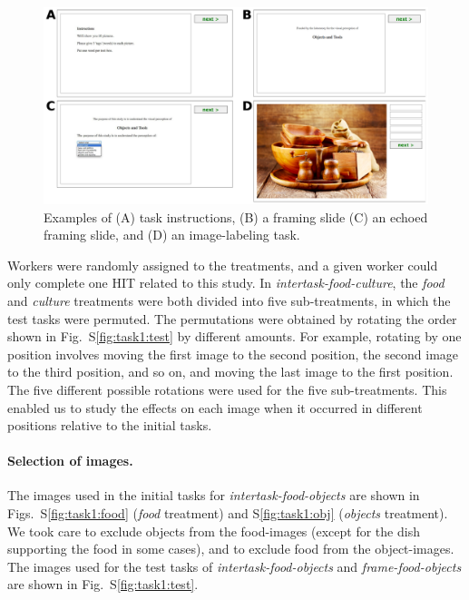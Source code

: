 \documentclass[12pt]{article}
\begin{document}
\begin{figure}
	\includegraphics[scale=0.8]{figs/tasks.pdf}
	\caption{Examples of (A) task instructions, (B) a framing slide
		(C) an echoed framing slide, and (D) an image-labeling 
		task.
	}
	\label{fig:hit_preamble}
\end{figure}
Workers were randomly assigned to the treatments, and 
a given worker could only complete one HIT related to this study.  
In \textit{intertask-food-culture}, the \textit{food} and \textit{culture}
treatments were both divided into five sub-treatments, 
in which the test tasks were permuted.  
The permutations were obtained by rotating 
the order shown in Fig.~S\ref{fig:task1:test} by different amounts. 
For example, rotating by one position involves moving the first image to the 
second position, the second image to the third position, and so on, and 
moving the last image to the first position.  
The five different possible rotations were used for the five 
sub-treatments.  This enabled us to study the effects on each image when
it occurred in different positions relative to the initial tasks.

\paragraph{Selection of images.} 

The images used in the initial tasks for \textit{intertask-food-objects}  
are shown in Figs.~S\ref{fig:task1:food} (\textit{food} treatment) and 
S\ref{fig:task1:obj} (\textit{objects} treatment).
We took care to exclude objects from
the food-images (except for the dish supporting the food in some cases), and 
to exclude food from the object-images.  The images used for the test tasks
of \textit{intertask-food-objects} and \textit{frame-food-objects} are shown 
in Fig.~S\ref{fig:task1:test}.
\end{document}
